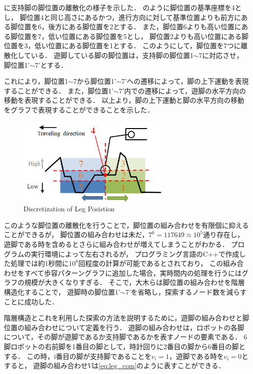 に支持脚の脚位置の離散化の様子を示した．
のように脚位置の基準座標を4とし，
脚位置4と同じ高さにあるかつ，進行方向に対して基準位置よりも前方にある脚位置を6，後方にある脚位置を2とする．
また，脚位置6よりも高い位置にある脚位置を7，低い位置にある脚位置を5とし，
脚位置2よりも高い位置にある脚位置を3，低い位置にある脚位置を1とする．
このようにして，脚位置を7つに離散化している．
遊脚している脚の脚位置は，支持脚の脚位置1$\sim$7に対応させ，脚位置1'$\sim$7'とする．%

これにより，脚位置1$\sim$7から脚位置1'$\sim$7'への遷移によって，脚の上下運動を表現することができる．
また，脚位置1'$\sim$7'内での遷移によって，遊脚の水平方向の移動を表現することができる．
以上より，脚の上下運動と脚の水平方向の移動をグラフで表現することができることを示した．

\begin{figure}[h]
  \begin{center}
    \includegraphics[width=75mm, clip]{figure/chapter2/discretization_of_leg_pos.png}
    \caption{Discretization of Leg Posistion}
    \label{fig:discretization} %
  \end{center}
\end{figure}

このような脚位置の離散化を行うことで，脚位置の組み合わせを有限個に抑えることができるが，
脚位置の組み合わせは未だ，$7^6 = 117649 \approx 10^5$通り存在し，
遊脚である時を含めるとさらに組み合わせが増えてしまうことがわかる．
プログラムの実行環境によって左右されるが，
プログラミング言語のC++で作成した処理では約1秒間に$10^8$回程度の計算が可能であるとされており\cite{Program_Challenge_Book}，
この組み合わせをすべて歩容パターングラフに追加した場合，実時間内の処理を行うにはグラフの規模が大きくなりすぎる．
そこで，大木らは脚位置の組み合わせを階層構造化することで，
遊脚時の脚位置1'$\sim$7'を省略し，探索するノード数を減らすことに成功した\cite{Oki_Graph_search}．

階層構造とこれを利用した探索の方法を説明するために，遊脚の組み合わせと脚位置の組み合わせについて定義を行う．
遊脚の組み合わせは，ロボットの各脚について，その脚が遊脚であるか支持脚であるかを表すノードの要素である．
6脚ロボットの右前脚を1番目の脚として，時計回りに2番目の脚から6番目の脚とする．
この時，i番目の脚が支持脚であることを$v_i = 1$，遊脚である時を$v_i = 0$とすると，
遊脚の組み合わせ$V$は\eqref{eq:leg_com}のように表すことができる．

